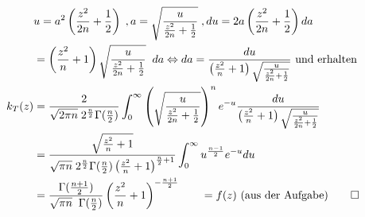 \documentclass[12pt]{article}
\begin{document}
\begin{align*}
	& u = a ^{2} \left(
		\frac{z^2}{2n} + \frac{ 1 }{ 2 }
	\right) \;,
	a = \sqrt{ \frac{ u }{  \frac{z^2}{2n} + \frac{ 1 }{ 2 }} }\; ,
	du = 2a \left(
		\frac{z^2}{2n} + \frac{ 1 }{ 2 }
	\right) da \\
	&= \left(
		\frac{ z^2 }{ n } + 1
		\right) \sqrt{
		\frac{ u }{ \frac{ z^2 }{ 2n } + \frac{ 1 }{ 2 } }
	} \;\; da
	\Leftrightarrow da = \frac{ du }{ \left(
		\frac{ z^2 }{ n } + 1
		\right) \sqrt{
		\frac{ u }{ \frac{ z^2 }{ 2n } + \frac{ 1 }{ 2 } }
	} } \text{ und erhalten } \\
	k_T (z) &= \frac{ 2 }{ 
		\sqrt{2 \pi n}\;  2 ^{\frac{ n }{ 2 }} \Gamma( \frac{ n }{ 2 } )
	}
	\int_{0}^{\infty} \left(
		\sqrt{ \frac{ u }{ \frac{ z^2 }{ 2n } + \frac{ 1 }{ 2 } } } 
	\right) ^{n}
	e ^{-u}
	\frac{ du }{ \left(
		\frac{ z^2 }{ n } + 1
		\right) \sqrt{\frac{ u }{ 
			\frac{ z^2 }{ 2n } + \frac{ 1 }{ 2 }
	}} 
} \\
	&= \frac{ \sqrt{
			\frac{ z^2 }{ n } + 1
		}  }{ 
		\sqrt{\pi n}\;  2 ^{\frac{ n }{ 2 }} \Gamma( \frac{ n }{ 2 } )
		\left(
			\frac{ z^2 }{ n } + 1
		\right) ^{\frac{ n }{ 2 } + 1}
	}
	\int_{0}^{\infty} u ^{\frac{n-1}{2}} e ^{-u} du \\
	&= \frac{ 
		\Gamma(\frac{n+1}{2})
	}{ \sqrt{\pi n} \;\;  \Gamma(\frac{ n }{ 2 })}
	\left(
		\frac{ z^2 }{ n } + 1
	\right) ^{ - 
		\frac{n+1}{2}
	} \qquad = f(z) \text{  (aus der Aufgabe)} \qed
\end{align*}
\end{document}
